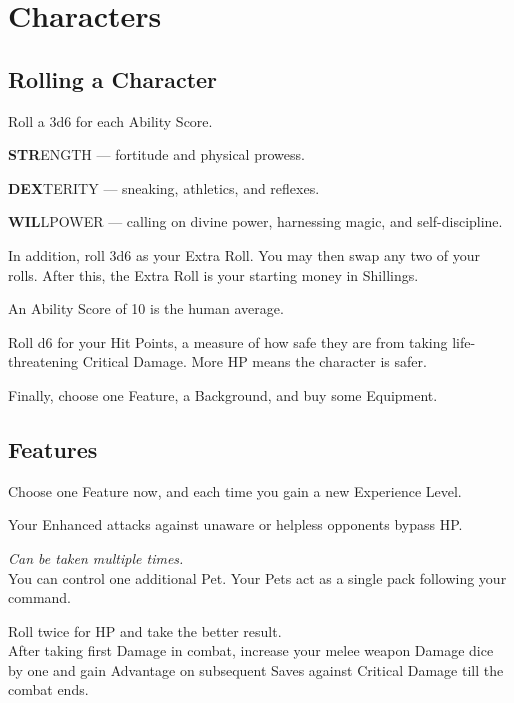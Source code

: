 \documentclass[itdr]{subfiles}
\begin{document}
\chapter{Characters}
\label{ch:characters}
\resetHeaders

\section{Rolling a Character}

Roll a 3d6 for each Ability Score.

\textbf{STR}ENGTH --- fortitude and physical prowess.

\textbf{DEX}TERITY --- sneaking, athletics, and reflexes.

\textbf{WIL}LPOWER --- calling on divine power, harnessing magic, and self-discipline.

In addition, roll 3d6 as your Extra Roll. You may then swap any two of your rolls. After this, the Extra Roll is your starting money in Shillings.

An Ability Score of 10 is the human average.

Roll d6 for your Hit Points, a measure of how safe they are from taking life-threatening Critical \mbox{Damage}. More HP means the character is safer.

Finally, choose one Feature, a Background, and buy some Equipment.

\section{Features}

Choose one Feature now, and each time you gain a new Experience Level.

\vfill
{}
Your Enhanced attacks against unaware or helpless opponents bypass HP.

\vfill
{} {\slshape Can be taken multiple times.}\\
You can control one additional Pet. Your Pets act as a single pack following your command.

\vfill
{} Roll twice for HP and take the better result.\\
After taking first Damage in combat, increase your melee weapon Damage dice by one and gain Advantage on subsequent Saves against Critical Damage till the combat ends.
\end{document}
